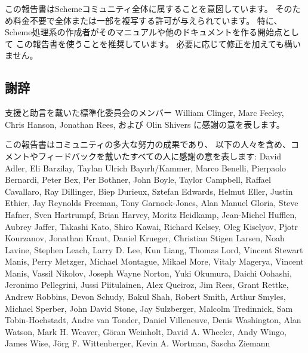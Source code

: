 \medskip

この報告書はSchemeコミュニティ全体に属することを意図しています。
そのため料金不要で全体または一部を複写する許可が与えられています。
特に、Scheme処理系の作成者がそのマニュアルや他のドキュメントを作る開始点として
この報告書を使うことを推奨しています。
必要に応じて修正を加えても構いません。




\subsection*{謝辞}

支援と助言を戴いた標準化委員会のメンバー
William Clinger, Marc Feeley, Chris Hanson, Jonathan Rees, および Olin Shivers
に感謝の意を表します。

この報告書はコミュニティの多大な努力の成果であり、
以下の人々を含め、コメントやフィードバックを戴いたすべての人に感謝の意を表します:
David Adler, Eli Barzilay, Taylan Ulrich
Bay\i{}rl\i/Kammer, Marco Benelli, Pierpaolo Bernardi,
Peter Bex, Per Bothner, John Boyle, Taylor Campbell, Raffael Cavallaro,
Ray Dillinger, Biep Durieux, Sztefan Edwards, Helmut Eller, Justin
Ethier, Jay Reynolds Freeman, Tony Garnock-Jones, Alan Manuel Gloria,
Steve Hafner, Sven Hartrumpf, Brian Harvey, Moritz Heidkamp, Jean-Michel
Hufflen, Aubrey Jaffer, Takashi Kato, Shiro Kawai, Richard Kelsey, Oleg
Kiselyov, Pjotr Kourzanov, Jonathan Kraut, Daniel Krueger, Christian
Stigen Larsen, Noah Lavine, Stephen Leach, Larry D. Lee, Kun Liang,
Thomas Lord, Vincent Stewart Manis, Perry Metzger, Michael Montague,
Mikael More, Vitaly Magerya, Vincent Manis, Vassil Nikolov, Joseph
Wayne Norton, Yuki Okumura, Daichi Oohashi, Jeronimo Pellegrini, Jussi
Piitulainen, Alex Queiroz, Jim Rees, Grant Rettke, Andrew Robbins, Devon
Schudy, Bakul Shah, Robert Smith, Arthur Smyles, Michael Sperber, John
David Stone, Jay Sulzberger, Malcolm Tredinnick, Sam Tobin-Hochstadt,
Andre van Tonder, Daniel Villeneuve, Denis Washington, Alan Watson,
Mark H.  Weaver, G\"oran Weinholt, David A. Wheeler, Andy Wingo, James
Wise, J\"org F. Wittenberger, Kevin A. Wortman, Sascha Ziemann

